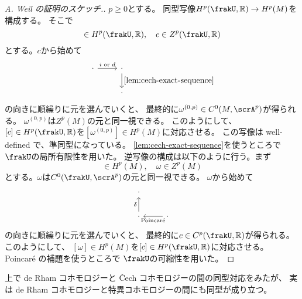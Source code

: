 \documentclass[report]{jlreq}
\begin{document}
\begin{proof}[A. Weil の証明のスケッチ.]
    $p \ge 0$とする。
    同型写像$H^p(\frakU, \R) \to H^p(M)$を構成する。
    そこで
    \begin{equation}
        [c] \in H^p(\frakU, \R),
        \quad
        c \in Z^p(\frakU, \R)
    \end{equation}
    とする。$c$から始めて
    \begin{equation}
        \begin{tikzcd}
            \cdot \ar{r}{i \text{ or } d} & \cdot \ar{d}{\cref{lem:cech-exact-sequence}} \\
            & \cdot
        \end{tikzcd}
    \end{equation}
    の向きに順繰りに元を選んでいくと、
    最終的に$\omega^{(0, p)} \in C^0(M, \scrA^p)$が得られる。
    $\omega^{(0, p)}$は$Z^p(M)$の元と同一視できる。
    このようにして、
    $[c] \in H^p(\frakU, \R)$を$[\omega^{(0, p)}] \in H^p(M)$に対応させる。
    この写像は well-defined で、準同型になっている。
    \cref{lem:cech-exact-sequence}を使うところで
    $\frakU$の局所有限性を用いた。
    逆写像の構成は以下のように行う。まず
    \begin{equation}
        [\omega] \in H^p(M),
        \quad
        \omega \in Z^p(M)
    \end{equation}
    とする。$\omega$は$C^0(\frakU, \scrA^p)$の元と同一視できる。
    $\omega$から始めて
    \begin{equation}
        \begin{tikzcd}
            \cdot \\
            \cdot \ar{u}{\delta} & \cdot \ar{l}{\text{Poincar\'{e}}}
        \end{tikzcd}
    \end{equation}
    の向きに順繰りに元を選んでいくと、
    最終的に$c \in C^p(\frakU, \R)$が得られる。
    このようにして、
    $[\omega] \in H^p(M)$を$[c] \in H^p(\frakU, \R)$に対応させる。
    Poincar\'{e} の補題を使うところで
    $\frakU$の可縮性を用いた。
\end{proof}

上で de Rham コホモロジーと \v{C}ech コホモロジーの間の同型対応をみたが、
実は de Rham コホモロジーと{\smooth}特異コホモロジーの間にも同型が成り立つ。
\end{document}
